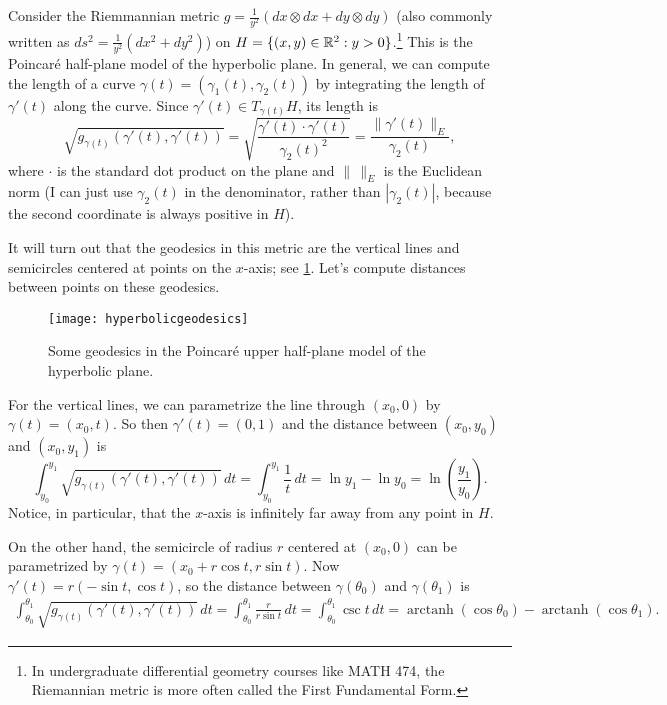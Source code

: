 \begin{example}
	Consider the Riemmannian metric $g = \frac{1}{y^2}(dx \otimes dx + dy \otimes dy)$ (also commonly written as $ds^2 = \frac{1}{y^2}(dx^2 + dy^2)$) on $H = \{(x,y) \in \mathbb{R}^2 : y > 0\}$.\footnote{In undergraduate differential geometry courses like MATH 474, the Riemannian metric is more often called the First Fundamental Form.} This is the Poincaré half-plane model of the hyperbolic plane. In general, we can compute the length of a curve $\gamma(t) = (\gamma_1(t),\gamma_2(t))$ by integrating the length of $\gamma'(t)$ along the curve. Since $\gamma'(t) \in T_{\gamma(t)}H$, its length is 
	\[
		\sqrt{g_{\gamma(t)}(\gamma'(t),\gamma'(t))} = \sqrt{\frac{\gamma'(t) \cdot \gamma'(t)}{\gamma_2(t)^2}} = \frac{\|\gamma'(t)\|_E}{\gamma_2(t)},
	\] 
	where $\cdot$ is the standard dot product on the plane and $\| \, \|_E$ is the Euclidean norm (I can just use $\gamma_2(t)$ in the denominator, rather than $|\gamma_2(t)|$, because the second coordinate is always positive in $H$).
	
	It will turn out that the geodesics in this metric are the vertical lines and semicircles centered at points on the $x$-axis; see \cref{fig:hyperbolicgeodesics}. Let's compute distances between points on these geodesics.
	
	\begin{figure}[htbp]
		\centering
			\texttt{[image: hyperbolicgeodesics]}
		\caption{Some geodesics in the Poincaré upper half-plane model of the hyperbolic plane.}
		\label{fig:hyperbolicgeodesics}
	\end{figure}
	
	For the vertical lines, we can parametrize the line through $(x_0,0)$ by $\gamma(t) = (x_0,t)$. So then $\gamma'(t) = (0,1)$ and the distance between $(x_0,y_0)$ and $(x_0,y_1)$ is
	\[
		\int_{y_0}^{y_1} \sqrt{g_{\gamma(t)}(\gamma'(t),\gamma'(t))}\,dt = \int_{y_0}^{y_1} \frac{1}{t}\, dt = \ln {y_1} - \ln {y_0} = \ln \left(\frac{y_1}{y_0}\right).
	\]
	Notice, in particular, that the $x$-axis is infinitely far away from any point in $H$.
	
	On the other hand, the semicircle of radius $r$ centered at $(x_0,0)$ can be parametrized by $\gamma(t) = (x_0 + r \cos t, r \sin t)$. Now $\gamma'(t) = r(-\sin t, \cos t)$, so the distance between $\gamma(\theta_0)$ and $\gamma(\theta_1)$ is
	\begin{multline*}
		\int_{\theta_0}^{\theta_1} \sqrt{g_{\gamma(t)}(\gamma'(t),\gamma'(t))}\, dt = \int_{\theta_0}^{\theta_1} \frac{r}{r \sin t} \, dt = \int_{\theta_0}^{\theta_1} \csc t\, dt = \operatorname{arctanh}(\cos\theta_0) - \operatorname{arctanh}(\cos \theta_1).
	\end{multline*}
\end{example}